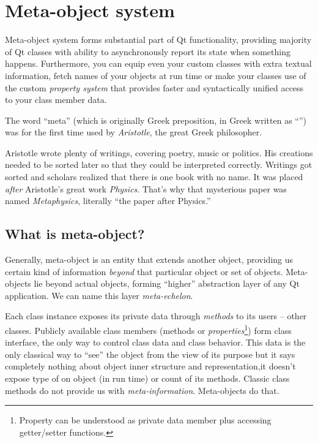 \chapter{Meta-object system}
Meta-object system forms substantial part of Qt functionality, providing majority of Qt classes with ability to asynchronously report its state when something happens. Furthermore, you can equip even your custom classes with extra textual information, fetch names of your objects at run time or make your classes use of the custom \textit{property system} that provides faster and syntactically unified access to your class member data.

\begin{fdocextra}
The word \enquote{meta} (which is originally Greek preposition, in Greek written as \enquote{\textmu \textepsilon \texttau \textalpha}) was for the first time used by \textit{Aristotle}, the great Greek philosopher.

Aristotle wrote plenty of writings, covering poetry, music or politics. His creations needed to be sorted later so that they could be interpreted correctly. Writings got sorted and scholars realized that there is one book with no name. It was placed \textit{after} Aristotle's great work \textit{Physics}. That's why that mysterious paper was named \textit{Metaphysics}, literally \enquote{the paper after Physics.}
\end{fdocextra}

\section{What is meta-object?}
Generally, meta-object is an entity that extends another object, providing us certain kind of information \textit{beyond} that particular object or set of objects. Meta-objects lie beyond actual objects, forming \enquote{higher} abstraction layer of any Qt application. We can name this layer \textit{meta-echelon}.

Each class instance exposes its private data through \textit{methods} to its users -- other classes. Publicly available class members (methods or \textit{properties}\footnote{Property can be understood as private data member plus accessing getter/setter functions.}) form class interface, the only way to control class data and class behavior. This data is the only classical way to \enquote{see} the object from the view of its purpose but it says completely nothing about object inner structure and representation,\eg it doesn't expose type of on object (in run time) or count of its methods. Classic class methods do not provide us with \textit{meta-information}. Meta-objects do that.

